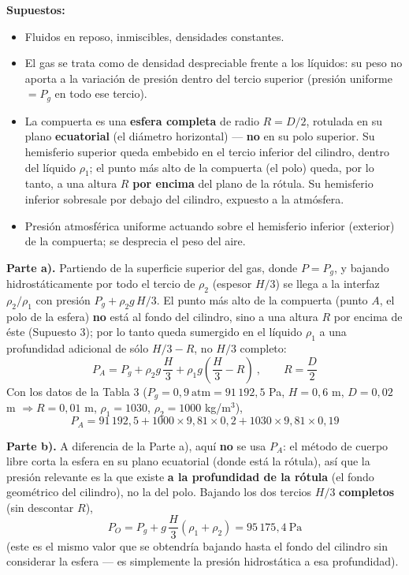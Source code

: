 \documentclass[11pt]{article}
\newenvironment{supuestos}{%
  \noindent\textbf{Supuestos:}
  \begin{itemize}[leftmargin=1.4em, itemsep=1pt]
}{%
  \end{itemize}
}
\begin{document}
\begin{supuestos}
\item Fluidos en reposo, inmiscibles, densidades constantes.
\item El gas se trata como de densidad despreciable frente a los l\'iquidos: su peso
no aporta a la variaci\'on de presi\'on dentro del tercio superior (presi\'on uniforme
$=P_g$ en todo ese tercio).
\item La compuerta es una \textbf{esfera completa} de radio $R=D/2$, rotulada en su
plano \textbf{ecuatorial} (el di\'ametro horizontal) --- \textbf{no} en su polo
superior. Su hemisferio superior queda embebido en el tercio inferior del cilindro,
dentro del l\'iquido $\rho_1$; el punto m\'as alto de la compuerta (el polo) queda, por
lo tanto, a una altura $R$ \textbf{por encima} del plano de la r\'otula. Su hemisferio
inferior sobresale por debajo del cilindro, expuesto a la atm\'osfera.
\item Presi\'on atmosf\'erica uniforme actuando sobre el hemisferio inferior (exterior)
de la compuerta; se desprecia el peso del aire.
\end{supuestos}

\textbf{Parte a).} Partiendo de la superficie superior del gas, donde $P=P_g$, y
bajando hidrost\'aticamente por todo el tercio de $\rho_2$ (espesor $H/3$) se llega a la
interfaz $\rho_2/\rho_1$ con presi\'on $P_g+\rho_2 g\,H/3$. El punto m\'as alto de la
compuerta (punto $A$, el polo de la esfera) \textbf{no} est\'a al fondo del cilindro,
sino a una altura $R$ por encima de \'este (Supuesto 3); por lo tanto queda sumergido en
el l\'iquido $\rho_1$ a una profundidad adicional de s\'olo $H/3-R$, no $H/3$ completo:
\begin{equation}
\boxed{P_A=P_g+\rho_2 g\,\frac H3+\rho_1 g\left(\frac H3-R\right)}\ ,\qquad R=\frac D2
\end{equation}
Con los datos de la Tabla 3 ($P_g=0{,}9\ \text{atm}=91\,192{,}5$ Pa, $H=0{,}6$ m,
$D=0{,}02$ m $\Rightarrow R=0{,}01$ m, $\rho_1=1030$, $\rho_2=1000$ kg/m$^3$),
\begin{equation}
P_A=91\,192{,}5+1000\times9{,}81\times0{,}2+1030\times9{,}81\times0{,}19
\end{equation}
\begin{center}
\end{center}

\textbf{Parte b).} A diferencia de la Parte a), aqu\'i \textbf{no} se usa $P_A$: el
m\'etodo de cuerpo libre corta la esfera en su plano ecuatorial (donde est\'a la
r\'otula), as\'i que la presi\'on relevante es la que existe \textbf{a la profundidad de
la r\'otula} (el fondo geom\'etrico del cilindro), no la del polo. Bajando los dos
tercios $H/3$ \textbf{completos} (sin descontar $R$),
\begin{equation}
P_O=P_g+g\,\frac H3(\rho_1+\rho_2)=95\,175{,}4\ \text{Pa}
\end{equation}
(este es el mismo valor que se obtendr\'ia bajando hasta el fondo del cilindro sin
considerar la esfera --- es simplemente la presi\'on hidrost\'atica a esa profundidad).
\end{document}
